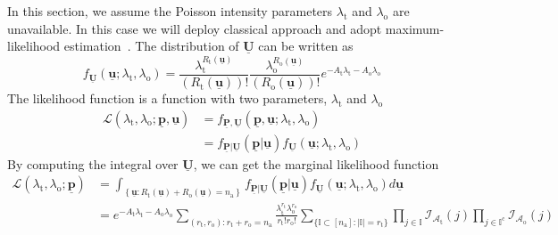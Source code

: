 In this section, we assume the Poisson intensity parameters $\lambda_{\mathrm{t}}$ and $\lambda_{\mathrm{o}}$ are unavailable. In this case we will deploy classical approach and adopt maximum-likelihood estimation~\cite{casella2001statistical}.
The distribution of $\underline{\mathbf{U}}$ can be written as
\begin{equation}
f_{\underline{\mathbf{U}}} \left( \underline{\mathbf{u}};
\lambda_{\mathrm{t}}, \lambda_{\mathrm{o}} \right)
= \frac{ \lambda_{\mathrm{t}}^{R_{\mathrm{t}}(\underline{\mathbf{u}})} }
{ ( R_{\mathrm{t}}(\underline{\mathbf{u}}) )! }
\frac{ \lambda_{\mathrm{o}}^{R_{\mathrm{o}}(\underline{\mathbf{u}})} }
{ ( R_{\mathrm{o}}(\underline{\mathbf{u}}) )! }
e^{- A_{\mathrm{t}} \lambda_{\mathrm{t}}
	- A_{\mathrm{o}} \lambda_{\mathrm{o}}} 
\end{equation}
The likelihood function is a function with two parameters, $\lambda_{\mathrm{t}}$ and $\lambda_{\mathrm{o}}$
\begin{equation}
\begin{split}
\mathcal{L} \left( \lambda_{\mathrm{t}}, \lambda_{\mathrm{o}};
\underline{\mathbf{p}}, \underline{\mathbf{u}} \right)
&= f_{\underline{\mathbf{P}}, \underline{\mathbf{U}}}
\left( \underline{\mathbf{p}}, \underline{\mathbf{u}};
\lambda_{\mathrm{t}}, \lambda_{\mathrm{o}} \right) \\
&= f_{\underline{\mathbf{P}} | \underline{\mathbf{U}}}
\left( \underline{\mathbf{p}} | \underline{\mathbf{u}} \right)
f_{\underline{\mathbf{U}}} \left( \underline{\mathbf{u}};
\lambda_{\mathrm{t}}, \lambda_{\mathrm{o}} \right) 
\end{split}
\end{equation}
By computing the integral over $\underline{\mathbf{U}}$, we can get the marginal likelihood function
\begin{equation} \label{equation:Likelihood}
\begin{split}
\mathcal{L} \left( \lambda_{\mathrm{t}}, \lambda_{\mathrm{o}};
\underline{\mathbf{p}} \right)
&= \int_{ \left\{ \underline{\mathbf{u}}
	: R_{\mathrm{t}}(\underline{\mathbf{u}}) +
	R_{\mathrm{o}}(\underline{\mathbf{u}}) = n_{\mathrm{a}} \right\} }
f_{\underline{\mathbf{P}} | \underline{\mathbf{U}}}
\left( \underline{\mathbf{p}} | \underline{\mathbf{u}} \right)
f_{\underline{\mathbf{U}}} \left( \underline{\mathbf{u}};
\lambda_{\mathrm{t}}, \lambda_{\mathrm{o}} \right) d\underline{\mathbf{u}} \\
&= e^{- A_{\mathrm{t}} \lambda_{\mathrm{t}}
	- A_{\mathrm{o}} \lambda_{\mathrm{o}}}
\sum_{(r_{\mathrm{t}}, r_{\mathrm{o}}) :
	r_{\mathrm{t}} + r_{\mathrm{o}} = n_{\mathrm{a}}}
\frac{\lambda_{\mathrm{t}}^{r_{\mathrm{t}}}
	\lambda_{\mathrm{o}}^{r_{\mathrm{o}}}}
{r_{\mathrm{t}}! r_{\mathrm{o}}!}
\sum_{\{ \mathbb{I} \subset [n_{\mathrm{a}}]
	: |\mathbb{I}| = r_{\mathrm{t}} \}}
\prod_{j \in \mathbb{I}}
\mathcal{I}_{\mathcal{A}_{\mathrm{t}}}(j)
\prod_{j \in \mathbb{I}^{\mathrm{c}}}
\mathcal{I}_{\mathcal{A}_{\mathrm{o}}}(j) 
\end{split}
\end{equation}
